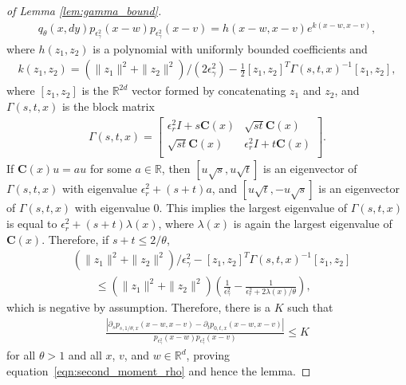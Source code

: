 \documentclass[EJP]{ejpecp} %
\newcommand{\IR}{\mathbb R}
\newcommand{\covq}{\mathbf{C}}     %
\begin{document}
\begin{proof}[of Lemma \ref{lem:gamma_bound}]
\begin{align*}
{            q_\theta(x, dy)
        }{
            p_{\epsilon_\gamma^2}(x - w)
            p_{\epsilon_\gamma^2}(x - v)
        }
        =
        h(x-w, x-v) e^{ k(x-w, x-v) },
    \end{align*}
    where $h(z_1, z_2)$ is a polynomial with uniformly bounded coefficients and
    \begin{align*}
        k(z_1, z_2)
        =
        (\|z_1\|^2 + \|z_2\|^2)/(2 \epsilon_\gamma^2)
            - \frac{1}{2} [z_1, z_2]^T \Gamma(s, t, x)^{-1} [z_1, z_2] ,
    \end{align*}
    where $[z_1, z_2]$ is the $\IR^{2d}$ vector formed by concatenating $z_1$ and $z_2$,
    and $\Gamma(s, t, x)$ is the block matrix
    \begin{align*}
        \Gamma(s, t, x)
        =
        \left[
        \begin{array}{cc}
            \epsilon_r^2 I + s \covq(x) & \sqrt{st} \covq(x) \\
            \sqrt{st} \covq(x) & \epsilon_r^2 I + t \covq(x) \\
        \end{array}
        \right] .
    \end{align*}
    If $\covq(x) u = a u$ for some $a \in \IR$,
    then $[u \sqrt{s}, u \sqrt{t}]$ is an eigenvector of $\Gamma(s, t, x)$
    with eigenvalue $\epsilon^2_r + (s+t) a$,
    and $[u \sqrt{t}, - u \sqrt{s}]$ is an eigenvector of $\Gamma(s, t, x)$
    with eigenvalue 0.
    This implies the largest eigenvalue of $\Gamma(s, t, x)$
    is equal to $\epsilon^2_r + (s+t) \lambda(x)$,
    where $\lambda(x)$ is again the largest eigenvalue of $\covq(x)$.
    Therefore, if $s + t \le 2 / \theta$,
    \begin{align*}
        &
        (\|z_1\|^2 + \|z_2\|^2) / \epsilon^2_\gamma
            - [z_1, z_2]^T \Gamma(s, t, x)^{-1} [z_1, z_2]
        \\ &\qquad \le
        (\|z_1\|^2 + \|z_2\|^2) \left(
            \frac{1}{\epsilon^2_\gamma}
            - \frac{1}{\epsilon^2_r +  2\lambda(x)/\theta}
        \right) ,
    \end{align*}
    which is negative by assumption.
    Therefore, there is a $K$ such that
    \begin{align*}
        \frac{ \left|
            \partial_s p_{s, 1/\theta, x}(x-w, x-v)
            - \partial_t p_{0, t, x}(x-w, x-v)
        \right| }{
            p_{\epsilon^2_\gamma}(x - w)
            p_{\epsilon^2_\gamma}(x - v)
        }
        \le K
    \end{align*}
    for all $\theta > 1$ and all $x$, $v$, and $w \in \IR^d$,
    proving equation~\eqref{eqn:second_moment_rho} and hence the lemma.
\end{proof}
\end{document}
